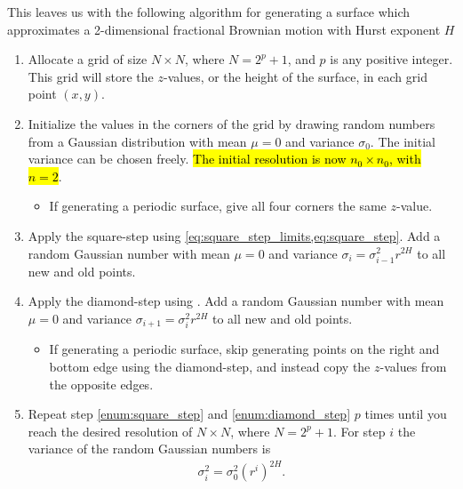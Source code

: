 This leaves us with the following algorithm for generating a surface which approximates a 2-dimensional fractional Brownian motion with Hurst exponent $H$
\begin{enumerate}
    \renewcommand{\labelitemii}{$\bullet$}
    
    \item Allocate a grid of size $N\times N$, where $N = 2^p + 1$, and $p$ is any positive integer. This grid will store the $z$-values, or the height of the surface, in each grid point $(x,y)$.

    \item Initialize the values in the corners of the grid by drawing random numbers from a Gaussian distribution with mean $\mu = 0$ and variance $\sigma_0$. The initial variance can be chosen freely. \hl{The initial resolution is now $n_0\times n_0$, with $n = 2$}.
    \begin{itemize}
        \item If generating a periodic surface, give all four corners the same $z$-value.
    \end{itemize}
    
    \item Apply the square-step using \cref{eq:square_step_limits,eq:square_step}. Add a random Gaussian number with mean $\mu = 0$ and variance $\sigma_i = \sigma_{i-1}^2r^{2H}$ to all new and old points.
    \label{enum:square_step}

    \item Apply the diamond-step using . Add a random Gaussian number with mean $\mu = 0$ and variance $\sigma_{i+1} = \sigma_i^2r^{2H}$ to all new and old points.
    \label{enum:diamond_step}
    
    \begin{itemize}
        \item If generating a periodic surface, skip generating points on the right and bottom edge using the diamond-step, and instead copy the $z$-values from the opposite edges.
    \end{itemize}
    
    \item Repeat step \ref{enum:square_step} and \ref{enum:diamond_step} $p$ times until you reach the desired resolution of $N\times N$, where $N = 2^p + 1$. For step $i$ the variance of the random Gaussian numbers is
    \begin{align*}
        \sigma_i^2 = \sigma_0^2(r^i)^{2H}.
    \end{align*}
    

\end{enumerate}

